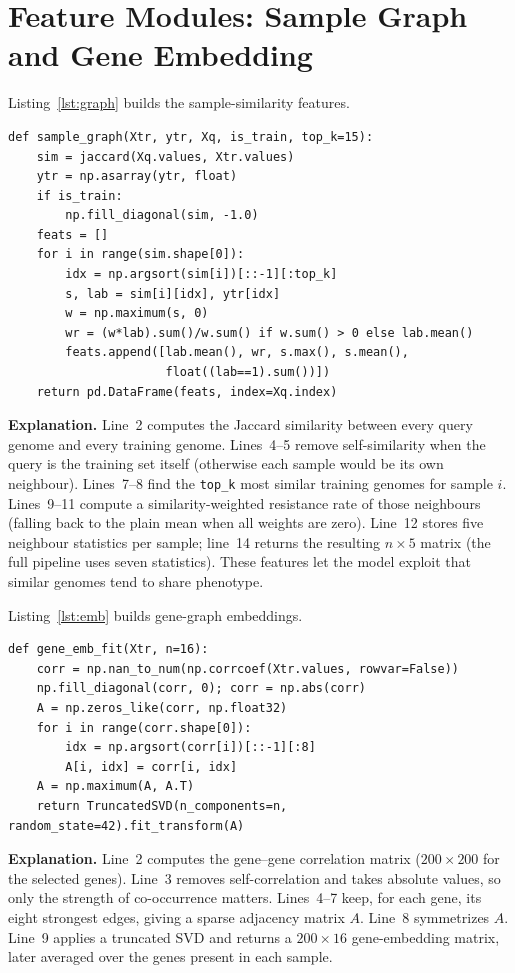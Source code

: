 \documentclass[../main.tex]{subfiles}
\begin{document}
\section{Feature Modules: Sample Graph and Gene Embedding}

Listing~\ref{lst:graph} builds the sample-similarity features.

\begin{lstlisting}[caption={Sample-graph neighbour statistics.},label=lst:graph]
def sample_graph(Xtr, ytr, Xq, is_train, top_k=15):
    sim = jaccard(Xq.values, Xtr.values)
    ytr = np.asarray(ytr, float)
    if is_train:
        np.fill_diagonal(sim, -1.0)
    feats = []
    for i in range(sim.shape[0]):
        idx = np.argsort(sim[i])[::-1][:top_k]
        s, lab = sim[i][idx], ytr[idx]
        w = np.maximum(s, 0)
        wr = (w*lab).sum()/w.sum() if w.sum() > 0 else lab.mean()
        feats.append([lab.mean(), wr, s.max(), s.mean(),
                      float((lab==1).sum())])
    return pd.DataFrame(feats, index=Xq.index)
\end{lstlisting}

\noindent\textbf{Explanation.} Line~2 computes the Jaccard similarity between every query genome and every training genome. Lines~4--5 remove self-similarity when the query is the training set itself (otherwise each sample would be its own neighbour). Lines~7--8 find the \texttt{top\_k} most similar training genomes for sample $i$. Lines~9--11 compute a similarity-weighted resistance rate of those neighbours (falling back to the plain mean when all weights are zero). Line~12 stores five neighbour statistics per sample; line~14 returns the resulting $n\times 5$ matrix (the full pipeline uses seven statistics). These features let the model exploit that similar genomes tend to share phenotype.

Listing~\ref{lst:emb} builds gene-graph embeddings.

\begin{lstlisting}[caption={Gene-graph embedding via truncated SVD.},label=lst:emb]
def gene_emb_fit(Xtr, n=16):
    corr = np.nan_to_num(np.corrcoef(Xtr.values, rowvar=False))
    np.fill_diagonal(corr, 0); corr = np.abs(corr)
    A = np.zeros_like(corr, np.float32)
    for i in range(corr.shape[0]):
        idx = np.argsort(corr[i])[::-1][:8]
        A[i, idx] = corr[i, idx]
    A = np.maximum(A, A.T)
    return TruncatedSVD(n_components=n, random_state=42).fit_transform(A)
\end{lstlisting}

\noindent\textbf{Explanation.} Line~2 computes the gene--gene correlation matrix ($200\times 200$ for the selected genes). Line~3 removes self-correlation and takes absolute values, so only the strength of co-occurrence matters. Lines~4--7 keep, for each gene, its eight strongest edges, giving a sparse adjacency matrix $A$. Line~8 symmetrizes $A$. Line~9 applies a truncated SVD and returns a $200\times 16$ gene-embedding matrix, later averaged over the genes present in each sample.
\end{document}
